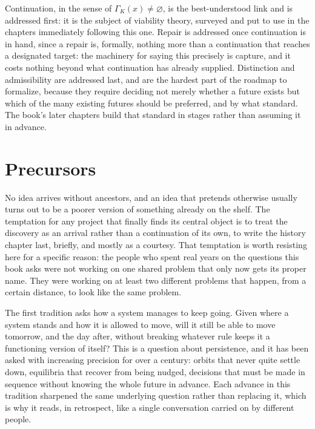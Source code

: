 \documentclass[11pt]{report}
\begin{document}
Continuation, in the sense of $\Gamma_K(x) \neq \varnothing$, is the
best-understood link and is addressed first: it is the subject of
viability theory, surveyed and put to use in the chapters immediately
following this one. Repair is addressed once continuation is in hand,
since a repair is, formally, nothing more than a continuation that
reaches a designated target: the machinery for saying this precisely
is capture, and it costs nothing beyond what continuation has already
supplied. Distinction and admissibility are addressed last, and are the
hardest part of the roadmap to formalize, because they require deciding
not merely whether a future exists but which of the many existing
futures should be preferred, and by what standard. The book's later
chapters build that standard in stages rather than assuming it in
advance.

\chapter{Precursors}

No idea arrives without ancestors, and an idea that pretends otherwise
usually turns out to be a poorer version of something already on the
shelf. The temptation for any project that finally finds its central
object is to treat the discovery as an arrival rather than a
continuation of its own, to write the history chapter last, briefly,
and mostly as a courtesy. That temptation is worth resisting here for a
specific reason: the people who spent real years on the questions this
book asks were not working on one shared problem that only now gets
its proper name. They were working on at least two different problems
that happen, from a certain distance, to look like the same problem.

The first tradition asks how a system manages to keep going. Given
where a system stands and how it is allowed to move, will it still be
able to move tomorrow, and the day after, without breaking whatever
rule keeps it a functioning version of itself? This is a question about
persistence, and it has been asked with increasing precision for over a
century: orbits that never quite settle down, equilibria that recover
from being nudged, decisions that must be made in sequence without
knowing the whole future in advance. Each advance in this tradition
sharpened the same underlying question rather than replacing it, which
is why it reads, in retrospect, like a single conversation carried on
by different people.
\end{document}
